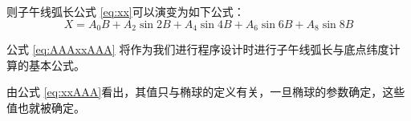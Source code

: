 \begin{enumerate}
则子午线弧长公式 \ref{eq:xx}可以演变为如下公式：
\begin{equation}
\label{eq:AAAxxAAA}
X= A_0 B + A_2 \sin 2B + A_4 \sin 4B + A_6 \sin 6B  + A_8 \sin 8B
\end{equation}

公式 \ref{eq:AAAxxAAA} 将作为我们进行程序设计时进行子午线弧长与底点纬度计算的基本公式。

由公式 \ref{eq:xxAAA}看出，其值只与椭球的定义有关，一旦椭球的参数确定，这些值也就被确定。








\end{enumerate}
